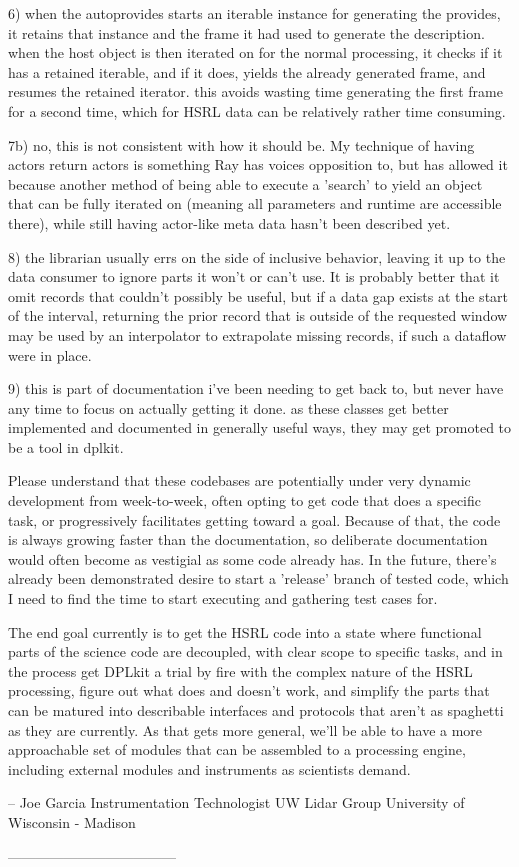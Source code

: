 6) when the autoprovides starts an iterable instance for generating the provides, it retains that instance and the frame it had used to generate the description. when the host object is then iterated on for the normal processing, it checks if it has a retained iterable, and if it does, yields the already generated frame, and resumes the retained iterator. this avoids wasting time generating the first frame for a second time, which for HSRL data can be relatively rather time consuming.

7b) no, this is not consistent with how it should be. My technique of having actors return actors is something Ray has voices opposition to, but has allowed it because another method of being able to execute a 'search' to yield an object that can be fully iterated on (meaning all parameters and runtime are accessible there), while still having actor-like meta data hasn't been described yet.

8) the librarian usually errs on the side of inclusive behavior, leaving it up to the data consumer to ignore parts it won't or can't use. It is probably better that it omit records that couldn't possibly be useful, but if a data gap exists at the start of the interval, returning the prior record that is outside of the requested window may be used by an interpolator to extrapolate missing records, if such a dataflow were in place.

9) this is part of documentation i've been needing to get back to, but never have any time to focus on actually getting it done.  as these classes get better implemented and documented in generally useful ways, they may get promoted to be a tool in dplkit.

Please understand that these codebases are potentially under very dynamic development from week-to-week, often opting to get code that does a specific task, or progressively facilitates getting toward a goal. Because of that, the code is always growing faster than the documentation, so deliberate documentation would often become as vestigial as some code already has.  In the future, there's already been demonstrated desire to start a 'release' branch of tested code, which I need to find the time to start executing and gathering test cases for.

The end goal currently is to get the HSRL code into a state where functional parts of the science code are decoupled, with clear scope to specific tasks, and in the process get DPLkit a trial by fire with the complex nature of the HSRL processing, figure out what does and doesn't work, and simplify the parts that can be matured into describable interfaces and protocols that aren't as spaghetti as they are currently. As that gets more general, we'll be able to have a more approachable set of modules that can be assembled to a processing engine, including external modules and instruments as scientists demand.

--
Joe Garcia
Instrumentation Technologist
UW Lidar Group
University of Wisconsin - Madison

------------------------------------
